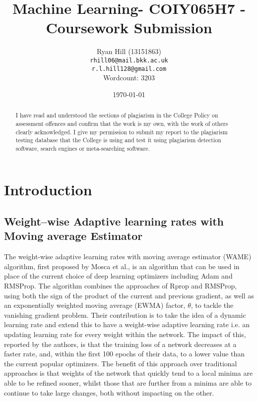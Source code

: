 \documentclass[12pt]{article}
\numberwithin{equation}{section}
\numberwithin{figure}{section}
\numberwithin{table}{section}
\begin{document}
%
\title{Machine Learning- COIY065H7 - Coursework Submission}
\author{Ryan Hill (13151863)\\
\texttt{rhill06@mail.bkk.ac.uk}\\
\texttt{r.l.hill128@gmail.com}\\
Wordcount: 3203
}
\date{\today}
\maketitle
\thispagestyle{empty}
%
%
\graphicspath{{images/}}
%
\begin{abstract}
I have read and understood the sections of plagiarism in the College Policy on assessment offences and confirm that the work is my own, with the work of others clearly acknowledged. I give my permission to submit my report to the plagiarism testing database that the College is using and test it using plagiarism detection software, search engines or meta-searching software.
\end{abstract}
%
\clearpage 
{\hypersetup{linkcolor=black}
\tableofcontents}
\thispagestyle{empty}
\clearpage
%
\section{Introduction}
\subsection{Weight–wise Adaptive learning rates with Moving average Estimator}
The weight-wise adaptive learning rates with moving average estimator (WAME) algorithm, first proposed by Mosca et al\cite{Mosca2017}., is an algorithm that can be used in place of the current choice of deep learning optimizers including Adam and RMSProp. The algorithm combines the approaches of Rprop and RMSProp, using both the sign of the product of the current and previous gradient, as well as an exponentially weighted moving average (EWMA) factor, $\theta$, to tackle the vanishing gradient problem. Their contribution is to take the idea of a dynamic learning rate and extend this to have a weight-wise adaptive learning rate i.e. an updating learning rate for every weight within the network. The impact of this, reported by the authors, is that the training loss of a network decreases at a faster rate, and, within the first 100 epochs of their data, to a lower value than the current popular optimizers. The benefit of this approach over traditional approaches is that weights of the network that quickly tend to a local minima are able to be refined sooner, whilst those that are further from a minima are able to continue to take large changes, both without impacting on the other.
\end{document}
